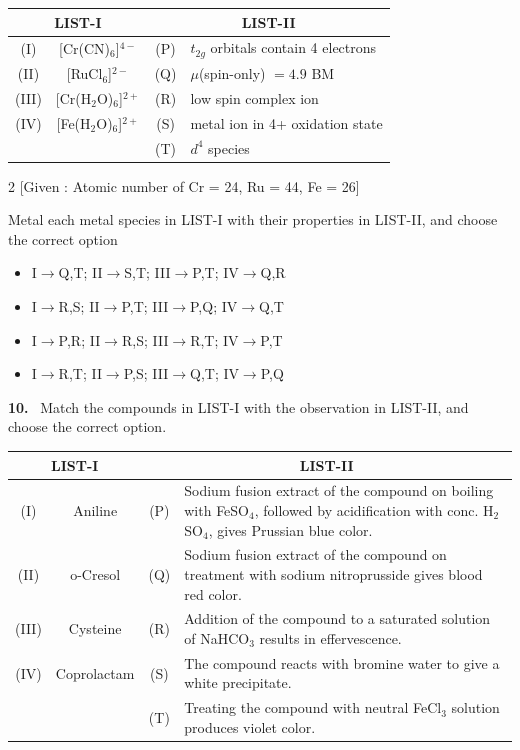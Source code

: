 \documentclass[10pt]{extarticle}
\newcommand{\qn}[1]{\par\smallskip\noindent\textbf{#1.}~}
\newenvironment{qoptions}{\begin{itemize}[leftmargin=1.8em,itemsep=1pt,topsep=2pt,label={}]}{\end{itemize}}
\newcommand{\opt}[2]{\item[(#1)] #2}
\begin{document}
\begin{center}
\begin{tabular}{|c|c|c|l|}
\hline
\multicolumn{2}{|c|}{LIST-I} & \multicolumn{2}{c|}{LIST-II} \\
\hline
(I) & [Cr(CN)$_6$]$^{4-}$ & (P) & $t_{2g}$ orbitals contain 4 electrons \\
\hline
(II) & [RuCl$_6$]$^{2-}$ & (Q) & $\mu$(spin-only) $=4.9$ BM \\
\hline
(III) & [Cr(H$_2$O)$_6$]$^{2+}$ & (R) & low spin complex ion \\
\hline
(IV) & [Fe(H$_2$O)$_6$]$^{2+}$ & (S) & metal ion in 4+ oxidation state \\
\hline
& & (T) & $d^4$ species \\
\hline
\end{tabular}
\end{center}
\begin{multicols}{2}
[Given : Atomic number of Cr = 24, Ru = 44, Fe = 26]

Metal each metal species in LIST-I with their properties in LIST-II, and choose the correct option
\begin{qoptions}
\opt{A}{I$\to$Q,T; II$\to$S,T; III$\to$P,T; IV$\to$Q,R}
\opt{B}{I$\to$R,S; II$\to$P,T; III$\to$P,Q; IV$\to$Q,T}
\opt{C}{I$\to$P,R; II$\to$R,S; III$\to$R,T; IV$\to$P,T}
\opt{D}{I$\to$R,T; II$\to$P,S; III$\to$Q,T; IV$\to$P,Q}
\end{qoptions}

\qn{10} Match the compounds in LIST-I with the observation in LIST-II, and choose the correct option.
\end{multicols}
\begin{center}
\begin{tabular}{|c|c|c|p{6.5cm}|}
\hline
\multicolumn{2}{|c|}{LIST-I} & \multicolumn{2}{c|}{LIST-II} \\
\hline
(I) & Aniline & (P) & Sodium fusion extract of the compound on boiling with FeSO$_4$, followed by acidification with conc. H$_2$SO$_4$, gives Prussian blue color. \\
\hline
(II) & o-Cresol & (Q) & Sodium fusion extract of the compound on treatment with sodium nitroprusside gives blood red color. \\
\hline
(III) & Cysteine & (R) & Addition of the compound to a saturated solution of NaHCO$_3$ results in effervescence. \\
\hline
(IV) & Coprolactam & (S) & The compound reacts with bromine water to give a white precipitate. \\
\hline
& & (T) & Treating the compound with neutral FeCl$_3$ solution produces violet color. \\
\hline
\end{tabular}
\end{center}
\end{document}
